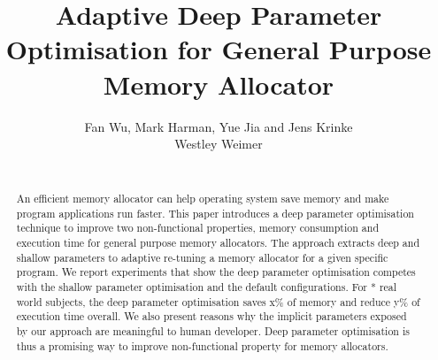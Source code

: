 \documentclass{sig-alternate}
\begin{document}
\title{Adaptive Deep Parameter Optimisation for General Purpose Memory Allocator}

%
\author{
%
%
\alignauthor Fan Wu, Mark Harman, Yue Jia and Jens Krinke\\
\alignauthor Westley Weimer\\
       \\
}

\maketitle
\begin{abstract}


An efficient memory allocator can help operating system save memory and make program applications run faster. This paper introduces a deep parameter optimisation technique to improve two non-functional properties, memory consumption and execution time for general purpose memory allocators. The approach extracts deep and shallow parameters to  adaptive re-tuning a memory allocator for a given specific program.
We report experiments that show the deep parameter optimisation competes with the shallow parameter optimisation and the default configurations. For * real world subjects, the deep parameter optimisation saves x\% of memory and reduce y\% of execution time overall.  We also present reasons why the implicit parameters exposed by our approach are meaningful to human developer. Deep parameter optimisation is thus a promising way to improve non-functional property for memory allocators.


\end{abstract}
\end{document}
